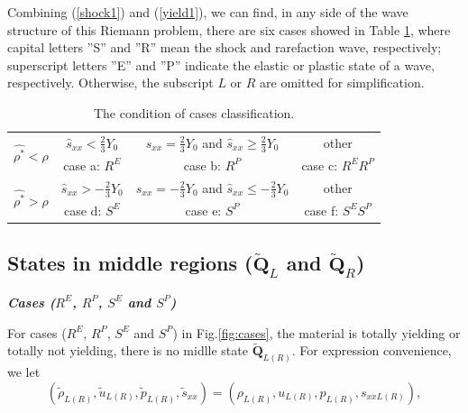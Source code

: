 \documentclass{article}
\numberwithin{equation}{section}
\numberwithin{table}{section}
\begin{document}
Combining (\ref{shock1}) and (\ref{yield1}), we can find, in any side of the wave structure of this Riemann problem, there are six cases showed in Table \ref{tab:cases}, where capital letters ''S'' and ''R'' mean the shock and rarefaction wave, respectively; superscript letters ''E'' and  ''P'' indicate the elastic or plastic state of a wave, respectively. Otherwise, the  subscript $L$ or  $R$  are omitted for simplification.


{\color{red}
\begin{table}
  \centering
  \caption{The condition of  cases classification.}
  \begin{tabular}{c|ccc}
	\toprule
	\multirow{2}{*}{  $\hat{\rho^*} <\rho$ }  &  $\hat{s}_{xx}<\frac{2}{3}Y_0$ & $s_{xx}=\frac{2}{3}Y_0$ and  $\hat{s}_{xx} \geq \frac{2}{3}Y_0$ &  other\\
	\cline{2-4}
 & case a: $R^{E}$ & case b: $ R^{P}$ & case c: $R^{E}R^{P}$ \\
 \hline
 \multirow{2}{*}{  $\hat{\rho^*} >\rho$ } & $\hat{s}_{xx} > -\frac{2}{3}Y_0$ & $s_{xx}=-\frac{2}{3}Y_0$  and  $\hat{s}_{xx} \leq -\frac{2}{3}Y_0$&  other\\
	\cline{2-4}
  & case d: $S^{E}$ & case e: $ S^{P}$ & case f: $S^{E}S^{P}$ \\
  \bottomrule
\end{tabular}
\label{tab:cases}
\end{table}
}

\subsection{States in  middle regions ($\tilde{\mathbf{Q}}_{L}$ and   $\tilde{\mathbf{Q}}_{R}$) }


\emph{\textbf{Cases ($R^{E}$, $R^{P}$, $S^{E}$ and $S^{P}$)}}

 For cases ($R^{E}$, $R^{P}$, $S^{E}$ and $S^{P}$) in Fig.\ref{fig:cases}, the material is totally yielding or totally not yielding, there is no midlle state $\tilde{\mathbf{Q}}_{L(R)}$. For  expression convenience, we let
 \begin{equation}
   (\tilde{\rho}_{L(R)},\tilde{u}_{L(R)},\tilde{p}_{L(R)},\tilde{s}_{xx}) =(\rho_{L(R)}, u_{L(R)},p_{L(R)},s_{xxL(R)}),
\end{equation}
\end{document}
